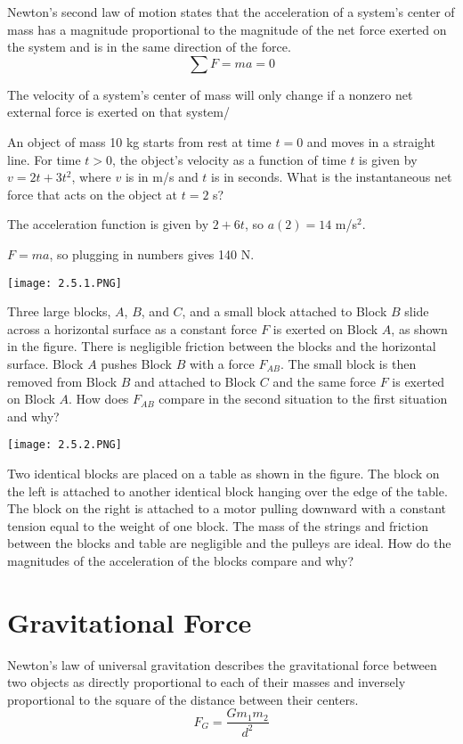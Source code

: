 \documentclass[../mech.tex]{subfiles}
\begin{document}
Newton's second law of motion states that the acceleration of a system's center of mass has a magnitude proportional to the magnitude of the net force exerted on the system and is in the same direction of the force.
\[ \sum F = ma =0 \]

The velocity of a system's center of mass will only change if a nonzero net external force is exerted on that system/

\begin{example}
    An object of mass 10 kg starts from rest at time $t=0$ and moves in a straight line. For time $t>0$, the object's velocity as a function of time $t$ is given by $v=2t+3t^2$, where $v$ is in m/s and $t$ is in seconds. What is the instantaneous net force that acts on the object at $t=2$ s?

    The acceleration function is given by $2+6t$, so $a(2)=14$ m/s$^2$.

    $F=ma$, so plugging in numbers gives 140 N.
\end{example}

\ex \begin{center}
    \texttt{[image: 2.5.1.PNG]}
\end{center}
Three large blocks, $A$, $B$, and $C$, and a small block attached to Block $B$ slide across a horizontal surface as a constant force $F$ is exerted on Block $A$, as shown in the figure.
There is negligible friction between the blocks and the horizontal surface. Block $A$ pushes Block $B$ with a force $F_{AB}$. The small block is then removed from Block $B$ and attached to Block $C$ and the same force $F$ 
is exerted on Block $A$. How does $F_{AB}$ compare in the second situation to the first situation and why?

\pagebreak
\ex \begin{center}
    \texttt{[image: 2.5.2.PNG]}
\end{center}
Two identical blocks are placed on a table as shown in the figure. The block on the left is attached to another identical block hanging over the edge of the table. The block on the right is attached to a motor pulling downward 
with a constant tension equal to the weight of one block. The mass of the strings and friction between the blocks and table are negligible and the pulleys are ideal. How do the magnitudes of the acceleration of the blocks compare and why?

\section{Gravitational Force}
Newton's law of universal gravitation describes the gravitational force between two objects as directly proportional to each of their masses and inversely proportional to the square of the distance between their centers.
\[ F_G = \frac{Gm_1m_2}{d^2} \]
\end{document}
